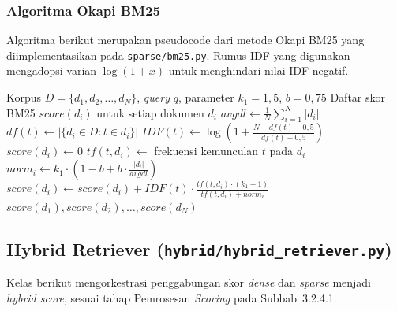 \subsubsection{Algoritma Okapi BM25}

Algoritma berikut merupakan pseudocode dari metode Okapi BM25 yang diimplementasikan pada \texttt{sparse/bm25.py}. Rumus IDF yang digunakan mengadopsi varian $\log(1 + x)$ untuk menghindari nilai IDF negatif.

\begin{algorithm}[H]
\caption{Okapi BM25 Scoring}
\label{alg:bm25}
\begin{algorithmic}[1]
\Require Korpus $D = \{d_1, d_2, \ldots, d_N\}$, \textit{query} $q$, parameter $k_1 = 1{,}5$, $b = 0{,}75$
\Ensure Daftar skor BM25 $\mathit{score}(d_i)$ untuk setiap dokumen $d_i$
\State $\mathit{avgdl} \gets \frac{1}{N} \sum_{i=1}^{N} |d_i|$ 
    \State $\mathit{df}(t) \gets |\{d_i \in D : t \in d_i\}|$ 
    \State $\mathit{IDF}(t) \gets \log\left(1 + \frac{N - \mathit{df}(t) + 0{,}5}{\mathit{df}(t) + 0{,}5}\right)$
\EndFor
{}
    \State $\mathit{score}(d_i) \gets 0$
            \State $\mathit{tf}(t, d_i) \gets$ frekuensi kemunculan $t$ pada $d_i$
            \State $\mathit{norm}_i \gets k_1 \cdot \left(1 - b + b \cdot \frac{|d_i|}{\mathit{avgdl}}\right)$
            \State $\mathit{score}(d_i) \gets \mathit{score}(d_i) + \mathit{IDF}(t) \cdot \frac{\mathit{tf}(t, d_i) \cdot (k_1 + 1)}{\mathit{tf}(t, d_i) + \mathit{norm}_i}$
        \EndIf
    \EndFor
\EndFor
\State \Return $\mathit{score}(d_1), \mathit{score}(d_2), \ldots, \mathit{score}(d_N)$
\end{algorithmic}
\end{algorithm}

\subsection{Hybrid Retriever (\texttt{hybrid/hybrid\_retriever.py})}

Kelas berikut mengorkestrasi penggabungan skor \textit{dense} dan \textit{sparse} menjadi \textit{hybrid score}, sesuai tahap Pemrosesan \textit{Scoring} pada Subbab~3.2.4.1.

